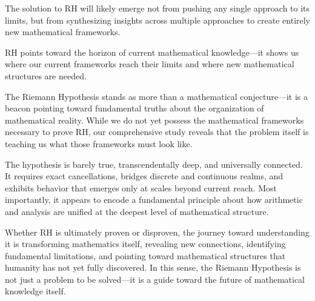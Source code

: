 \begin{reflection}
The solution to RH will likely emerge not from pushing any single approach to its limits, but from synthesizing insights across multiple approaches to create entirely new mathematical frameworks.
\end{reflection}

\begin{reflection}
RH points toward the horizon of current mathematical knowledge—it shows us where our current frameworks reach their limits and where new mathematical structures are needed.
\end{reflection}

\begin{conclusion}
The Riemann Hypothesis stands as more than a mathematical conjecture—it is a beacon pointing toward fundamental truths about the organization of mathematical reality. While we do not yet possess the mathematical frameworks necessary to prove RH, our comprehensive study reveals that the problem itself is teaching us what those frameworks must look like.

The hypothesis is barely true, transcendentally deep, and universally connected. It requires exact cancellations, bridges discrete and continuous realms, and exhibits behavior that emerges only at scales beyond current reach. Most importantly, it appears to encode a fundamental principle about how arithmetic and analysis are unified at the deepest level of mathematical structure.

Whether RH is ultimately proven or disproven, the journey toward understanding it is transforming mathematics itself, revealing new connections, identifying fundamental limitations, and pointing toward mathematical structures that humanity has not yet fully discovered. In this sense, the Riemann Hypothesis is not just a problem to be solved—it is a guide toward the future of mathematical knowledge itself.
\end{conclusion}